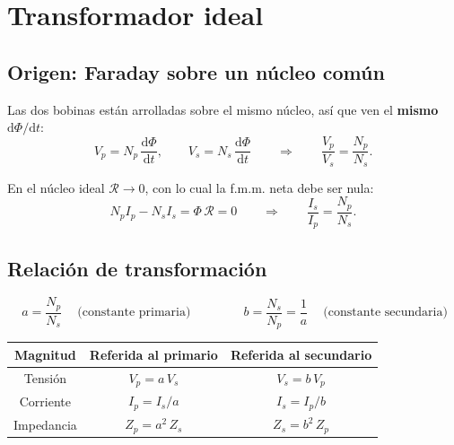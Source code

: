 \documentclass[11pt,a4paper]{article}
\newcommand{\Rel}{\mathcal{R}}          %
\begin{document}
\section{Transformador ideal}

\subsection{Origen: Faraday sobre un núcleo común}

Las dos bobinas están arrolladas sobre el mismo núcleo, así que ven el
\textbf{mismo} $\mathrm{d}\Phi/\mathrm{d}t$:
\begin{equation}
  V_p = N_p\,\frac{\mathrm{d}\Phi}{\mathrm{d}t},
  \qquad
  V_s = N_s\,\frac{\mathrm{d}\Phi}{\mathrm{d}t}
  \qquad\Longrightarrow\qquad
  \frac{V_p}{V_s} = \frac{N_p}{N_s} .
\end{equation}

En el núcleo ideal $\Rel \to 0$, con lo cual la f.m.m. neta debe ser nula:
\begin{equation}
  N_p I_p - N_s I_s = \Phi\,\Rel = 0
  \qquad\Longrightarrow\qquad
  \frac{I_s}{I_p} = \frac{N_p}{N_s} .
\end{equation}

\subsection{Relación de transformación}

\begin{equation}
  \boxed{\ a = \frac{N_p}{N_s} \ } \quad\text{(constante primaria)}
  \qquad\qquad
  \boxed{\ b = \frac{N_s}{N_p} = \frac{1}{a} \ } \quad\text{(constante secundaria)}
\end{equation}

\begin{table}[h]
\centering
\begin{tabular}{@{}ccc@{}}
\toprule
\textbf{Magnitud} & \textbf{Referida al primario} & \textbf{Referida al secundario} \\
\midrule
Tensión    & $V_p = a\,V_s$    & $V_s = b\,V_p$ \\
Corriente  & $I_p = I_s/a$     & $I_s = I_p/b$ \\
Impedancia & $Z_p = a^2\,Z_s$  & $Z_s = b^2\,Z_p$ \\
\bottomrule
\end{tabular}
\end{table}
\end{document}
